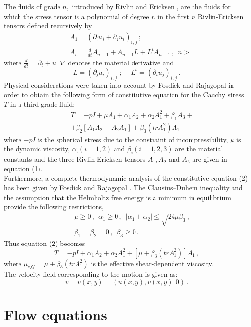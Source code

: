 \documentclass[twocolumn,showpacs,preprintnumbers,amsmath,amssymb]{revtex4}
\newcommand{\bea}{\begin{eqnarray}}
\newcommand{\eea}{\end{eqnarray}}
\begin{document}
The fluids of grade $n,$ introduced by Rivlin and Ericksen
\cite{Rivlin}, are the fluids for which the stress tensor is a
polynomial of degree $n$ in the first $n$ Rivlin-Ericksen tensors
defined recursively by \bea \nonumber &&A_1 = (\partial_i u_j
+\partial_j u_i)_{i,\, j}\,;\\&& A_n = \frac{d}{dt}A_{n-1} + A_{n-1}
L + L^t A_{n-1}\,, \,\,\, n > 1 \eea where $\frac{d}{dt}=\partial_t + u
\cdot\nabla$ denotes the material derivative and
\begin{equation}
L=(\partial_j u_i)_{i,\,j} \, \, ; \,\,\,\,\,\,\, L^t=(\partial_i
u_j)_{i,\,j} \, .\nonumber
\end{equation}
Physical considerations were taken into account by Fosdick and
Rajagopal \cite{Fosdic} in order to obtain the following form of
constitutive equation for the Cauchy stress $T$ in a third grade
fluid: \bea\nonumber &&T = -pI + \mu
A_1+\alpha_1A_2+\alpha_2A^2_1+\beta_1 A_3+\\&&+
\beta_2[A_1A_2+A_2A_1]+\beta_3(tr A^2_1)A_1 \eea where $-pI$ is the
spherical stress due to the constraint of incompressibility, $\mu$
is the dynamic viscosity, $\alpha_i(i=1,2)$ and $\beta_i(i=1,2,3)$
are the material constants and the three
Rivlin-Ericksen tensors $A_1, A_2$ and $A_3$ are given in equation (1).\\
Furthermore, a complete thermodynamic analysis of the constitutive
equation (2) has been given by Fosdick and Rajagopal \cite{Fosdic}.
The Clausius--Duhem inequality and the assumption that the Helmholtz
free energy is a minimum in equilibrium provide the following
restrictions, \bea\nonumber &&\mu \geq 0\, ,\,\,\,\alpha_1 \geq 0\,
,\,\,\,|\alpha_1 + \alpha_2| \leq \sqrt{24 \mu \beta_3}\,,\\&&
\beta_1=\beta_2=0\, ,\,\,\,\beta_3 \geq 0\,. \eea Thus equation (2)
becomes
\begin{equation}
T=-pI+\alpha_1 A_2 + \alpha_2 A^2_1 +[\mu +\beta_3(tr A^2_1)]A_1\, ,
\nonumber
\end{equation}
where $\mu_{eff}= \mu + \beta_3(trA^2_1)$ is the effective
shear-dependent viscosity.\\
The velocity field corresponding to the motion is given as:
$$v=v(x,y)=(u(x,y), v(x,y), 0)\,.$$

\section{\label{sec:level3}Flow equations}
\end{document}
